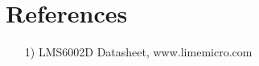 \documentclass{article}
\begin{document}

\section*{References}
\begin{itemize}
	\item[1)] LMS6002D Datasheet, www.limemicro.com
\end{itemize}
\end{document}
